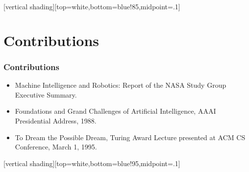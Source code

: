 \documentclass{beamer}
\begin{document}
 [vertical shading][top=white,bottom=blue!85,midpoint=.1]
 \section{Contributions}
\begin{frame}
\transwipe
 \frametitle{Contributions}
 \begin{itemize}
  \item Machine Intelligence and Robotics: Report of the NASA Study Group 
   Executive Summary.
  \item Foundations and Grand Challenges of Artificial Intelligence, AAAI 
   Presidential Address, 1988.
  \item To Dream the Possible Dream, Turing Award Lecture presented at ACM
   CS Conference, March 1, 1995.
 \end{itemize}
\end{frame}

[vertical shading][top=white,bottom=blue!95,midpoint=.1] 
\end{document}
